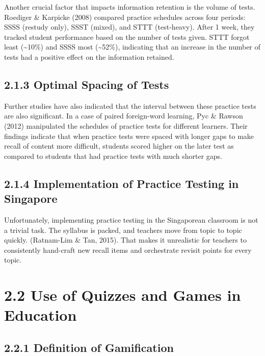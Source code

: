\documentclass[
  12pt,
  a4paper,
]{report}
\begin{document}
Another crucial factor that impacts information retention is the volume
of tests. Roediger \& Karpicke (2008) compared practice schedules across
four periods: SSSS (restudy only), SSST (mixed), and STTT (test-heavy).
After 1 week, they tracked student performance based on the number of
tests given. STTT forgot least (\textasciitilde10\%) and SSSS most
(\textasciitilde52\%), indicating that an increase in the number of
tests had a positive effect on the information retained.

\hypertarget{optimal-spacing-of-tests}{%
\subsection{2.1.3 Optimal Spacing of
Tests}\label{optimal-spacing-of-tests}}

Further studies have also indicated that the interval between these
practice tests are also significant. In a case of paired foreign-word
learning, Pyc \& Rawson (2012) manipulated the schedules of practice
tests for different learners. Their findings indicate that when practice
tests were spaced with longer gaps to make recall of content more
difficult, students scored higher on the later test as compared to
students that had practice tests with much shorter gaps.

\hypertarget{implementation-of-practice-testing-in-singapore}{%
\subsection{2.1.4 Implementation of Practice Testing in
Singapore}\label{implementation-of-practice-testing-in-singapore}}

Unfortunately, implementing practice testing in the Singaporean
classroom is not a trivial task. The syllabus is packed, and teachers
move from topic to topic quickly. (Ratnam-Lim \& Tan, 2015). That makes
it unrealistic for teachers to consistently hand-craft new recall items
and orchestrate revisit points for every topic.

\hypertarget{use-of-quizzes-and-games-in-education}{%
\section{2.2 Use of Quizzes and Games in
Education}\label{use-of-quizzes-and-games-in-education}}

\hypertarget{definition-of-gamification}{%
\subsection{2.2.1 Definition of
Gamification}\label{definition-of-gamification}}
\end{document}
